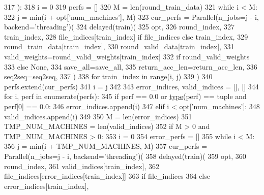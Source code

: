 \begin{DoxyCode}
317 ):
318     i = 0
319     perfs = []
320     M = len(round\_train\_data)
321     \textcolor{keywordflow}{while} i < M:
322         j = min(i + opt[\textcolor{stringliteral}{'num\_machines'}], M)
323         cur\_perfs = Parallel(n\_jobs=j - i, backend=\textcolor{stringliteral}{'threading'})(
324             delayed(train)(
325                 opt,
326                 round\_index,
327                 train\_index,
328                 file\_indices[train\_index] \textcolor{keywordflow}{if} file\_indices \textcolor{keywordflow}{else} train\_index,
329                 round\_train\_data[train\_index],
330                 round\_valid\_data[train\_index],
331                 valid\_weights=round\_valid\_weights[train\_index]
332                 \textcolor{keywordflow}{if} round\_valid\_weights
333                 \textcolor{keywordflow}{else} \textcolor{keywordtype}{None},
334                 save\_all=save\_all,
335                 return\_acc\_len=return\_acc\_len,
336                 seq2seq=seq2seq,
337             )
338             \textcolor{keywordflow}{for} train\_index \textcolor{keywordflow}{in} range(i, j)
339         )
340         perfs.extend(cur\_perfs)
341         i = j
342 
343     error\_indices, valid\_indices = [], []
344     \textcolor{keywordflow}{for} i, perf \textcolor{keywordflow}{in} enumerate(perfs):
345         \textcolor{keywordflow}{if} perf == 0.0 \textcolor{keywordflow}{or} \hyperlink{namespaceprojects_1_1mastering__the__dungeon_1_1mturk_1_1tasks_1_1MTD_1_1run_a0d607cd3866953f5de198f609be7c0fc}{type}(perf) == tuple \textcolor{keywordflow}{and} perf[0] == 0.0:
346             error\_indices.append(i)
347         \textcolor{keywordflow}{elif} i < opt[\textcolor{stringliteral}{'num\_machines'}]:
348             valid\_indices.append(i)
349 
350     M = len(error\_indices)
351     TMP\_NUM\_MACHINES = len(valid\_indices)
352     \textcolor{keywordflow}{if} M > 0 \textcolor{keywordflow}{and} TMP\_NUM\_MACHINES > 0:
353         i = 0
354         error\_perfs = []
355         \textcolor{keywordflow}{while} i < M:
356             j = min(i + TMP\_NUM\_MACHINES, M)
357             cur\_perfs = Parallel(n\_jobs=j - i, backend=\textcolor{stringliteral}{'threading'})(
358                 delayed(train)(
359                     opt,
360                     round\_index,
361                     valid\_indices[train\_index],
362                     file\_indices[error\_indices[train\_index]]
363                     \textcolor{keywordflow}{if} file\_indices
364                     \textcolor{keywordflow}{else} error\_indices[train\_index],

\end{DoxyCode}
